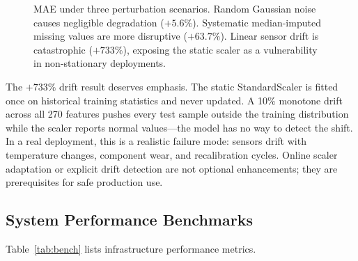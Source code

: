 \documentclass[10pt, journal, letterpaper]{IEEEtran}
\begin{document}
\begin{figure}[htbp]
\centering
{}
\caption{MAE under three perturbation scenarios. Random Gaussian noise causes
negligible degradation ($+5.6\%$). Systematic median-imputed missing values
are more disruptive ($+63.7\%$). Linear sensor drift is catastrophic
($+733\%$), exposing the static scaler as a vulnerability in non-stationary
deployments.}
\label{fig:robust}
\end{figure}

The $+733\%$ drift result deserves emphasis. The static StandardScaler is
fitted once on historical training statistics and never updated. A 10\%
monotone drift across all 270 features pushes every test sample outside
the training distribution while the scaler reports normal values—the model
has no way to detect the shift. In a real deployment, this is a realistic
failure mode: sensors drift with temperature changes, component wear, and
recalibration cycles. Online scaler adaptation or explicit drift detection
are not optional enhancements; they are prerequisites for safe production use.

\subsection{System Performance Benchmarks}

Table~\ref{tab:bench} lists infrastructure performance metrics.
\end{document}
